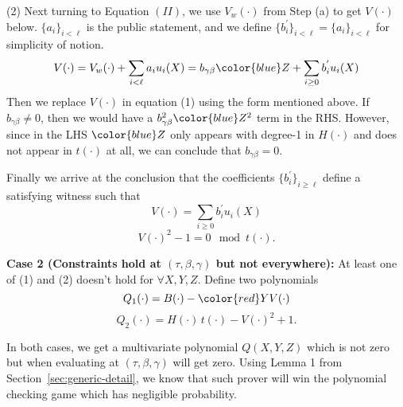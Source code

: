 \documentclass{article}
\theoremstyle{definition}
\theoremstyle{remark}
\begin{document}
(2) Next turning to Equation $(II)$, we use $V_w(\cdot)$ from Step (a) to get $V(\cdot)$ below. $\{a_i\}_{i<\ell}$ is the public statement, and we define $\{b^{'}_i\}_{i<\ell}=\{a_i\}_{i<\ell}$ for simplicity of notion.
$$V(\cdot) = V_w(\cdot) + \sum_{i < \ell}a_i u_i(X) = b_{\gamma \beta}{\color{blue}Z} + \sum_{i \ge 0}b^{'}_i u_i(X)$$
Then we replace $V(\cdot)$ in equation (1) using the form mentioned above. If $b_{\gamma \beta} \neq 0$, then we would have a $b_{\gamma \beta}^2{\color{blue}Z^2}$ term in the RHS. However, since in the LHS ${\color{blue}Z}$ only appears with degree-1 in $H(\cdot)$ and does not appear in $t(\cdot)$ at all, we can conclude that $b_{\gamma \beta}=0$.

Finally we arrive at the conclusion that the coefficients $\{b^{'}_i\}_{i \ge \ell}$ define a satisfying witness such that
$$V(\cdot) = \sum_{i \ge 0}b^{'}_i u_i(X)$$ 
$$V(\cdot)^2 - 1 = 0 \mod t(\cdot).$$

\textbf{Case 2 (Constraints hold at $(\tau,\beta,\gamma)$ but not everywhere):} At least one of (1) and (2) doesn't hold for $\forall X,Y,Z$.
Define two polynomials
$$Q_1(\cdot) = B(\cdot) - {\color{red}Y} V(\cdot)$$
$$Q_2(\cdot) = H(\cdot) \, t(\cdot) -  V(\cdot)^2 + 1.$$

In both cases, we get a multivariate polynomial $Q(X,Y,Z)$ which is not zero but when evaluating at $(\tau,\beta,\gamma)$ will get zero. Using Lemma 1 from Section~\ref{sec:generic-detail}, we know that such prover will win the polynomial checking game which has negligible probability.


\end{document}
